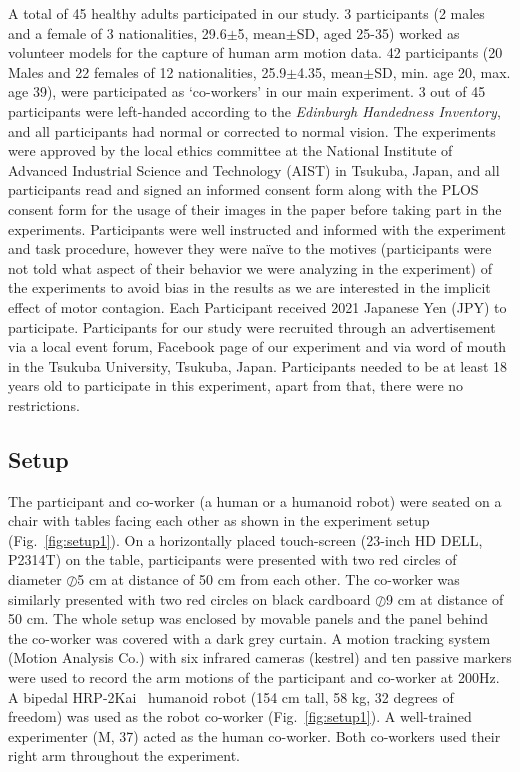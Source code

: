 \documentclass[a4paper, 12pt, oneside]{Thesis}  %
\begin{document}
A total of 45 healthy adults participated in our study. 3 participants (2 males and a female of 3 nationalities, 29.6$\pm$5, mean$\pm$SD, aged 25-35) worked as volunteer models for the capture of human arm motion data. 42 participants (20 Males and 22 females of 12 nationalities, 25.9$\pm$4.35, mean$\pm$SD, min. age 20, max. age 39), were participated as `co-workers' in our main experiment. 3 out of 45 participants were left-handed according to the {\it Edinburgh Handedness Inventory}, and all participants had normal or corrected to normal vision. The experiments were approved by the local ethics committee at the National Institute of Advanced Industrial Science and Technology (AIST) in Tsukuba, Japan, and all participants read and signed an informed consent form along with the PLOS consent form for the usage of their images in the paper before taking part in the experiments. Participants were well instructed and informed with the experiment and task procedure, however they were na\"ive to the motives (participants were not told what aspect of their behavior we were analyzing in the experiment) of the experiments to avoid bias in the results as we are interested in the implicit effect of motor contagion. Each Participant received 2021 Japanese Yen (JPY) to participate. 
Participants for our study were recruited through an advertisement via a local event forum, Facebook page of our experiment and via word of mouth in the Tsukuba University, Tsukuba, Japan. Participants needed to be at least 18 years old to participate in this experiment, apart from that, there were no restrictions.

\subsection{Setup}

The participant and co-worker (a human or a humanoid robot) were seated on a chair with tables facing each other as shown in the experiment setup (Fig.~\ref{fig:setup1}). On a horizontally placed touch-screen (23-inch HD DELL, P2314T) on the table, participants were presented with two red circles of diameter $\oslash$5 cm at distance of 50 cm from each other. The co-worker was similarly presented with two red circles on black cardboard $\oslash$9 cm at distance of 50 cm. The whole setup was enclosed by movable panels and the panel behind the co-worker was covered with a dark grey curtain. A motion tracking system (Motion Analysis Co.) with six infrared cameras (kestrel) and ten passive markers were used to record the arm motions of the participant and co-worker at 200Hz. A bipedal HRP-2Kai~\cite{Kaneko:RAS_ICHR:2015} humanoid robot (154 cm tall, 58 kg, 32 degrees of freedom) was used as the robot co-worker (Fig.~\ref{fig:setup1}). A well-trained experimenter (M, 37) acted as the human co-worker. Both co-workers used their right arm throughout the experiment.
\end{document}
